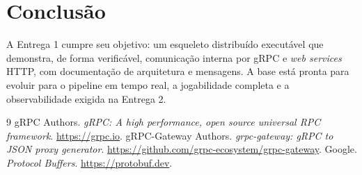 \documentclass[12pt]{article}
\begin{document}
\section{Conclusão}

A Entrega 1 cumpre seu objetivo: um esqueleto distribuído executável que demonstra, de forma
verificável, comunicação interna por gRPC e \textit{web services} HTTP, com documentação de
arquitetura e mensagens. A base está pronta para evoluir para o pipeline em tempo real, a
jogabilidade completa e a observabilidade exigida na Entrega 2.

\begin{thebibliography}{9}
 gRPC Authors. \textit{gRPC: A high performance, open source universal RPC framework}. \url{https://grpc.io}.
 gRPC-Gateway Authors. \textit{grpc-gateway: gRPC to JSON proxy generator}. \url{https://github.com/grpc-ecosystem/grpc-gateway}.
 Google. \textit{Protocol Buffers}. \url{https://protobuf.dev}.
\end{thebibliography}
\end{document}
